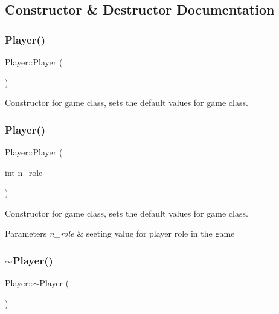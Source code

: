 \subsection{Constructor \& Destructor Documentation}
\mbox{\label{class_player_affe0cc3cb714f6deb4e62f0c0d3f1fd8}} 
\subsubsection{\texorpdfstring{Player()}{Player()}\hspace{0.1cm}{\footnotesize\ttfamily [1/2]}}
{\footnotesize\ttfamily Player\+::\+Player (\begin{DoxyParamCaption}{ }\end{DoxyParamCaption})}



Constructor for game class, sets the default values for game class. 

\mbox{\label{class_player_a8fd722300bd72d1d043e789e7ed2a39b}} 
\subsubsection{\texorpdfstring{Player()}{Player()}\hspace{0.1cm}{\footnotesize\ttfamily [2/2]}}
{\footnotesize\ttfamily Player\+::\+Player (\begin{DoxyParamCaption}\item[{int}]{n\+\_\+role }\end{DoxyParamCaption})}



Constructor for game class, sets the default values for game class. 


\begin{DoxyParams}{Parameters}
{\em n\+\_\+role} & seeting value for player role in the game \\
\hline
\end{DoxyParams}
\mbox{\label{class_player_a749d2c00e1fe0f5c2746f7505a58c062}} 
\subsubsection{\texorpdfstring{$\sim$\+Player()}{~Player()}}
{\footnotesize\ttfamily Player\+::$\sim$\+Player (\begin{DoxyParamCaption}{ }\end{DoxyParamCaption})}



